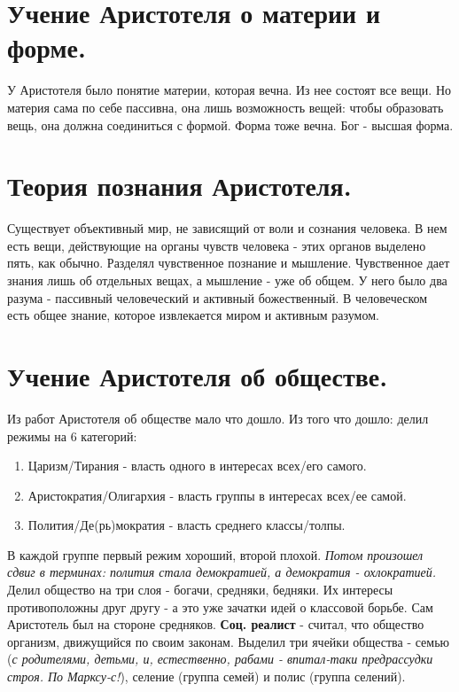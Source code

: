 \section{Учение Аристотеля о материи и форме.}
У Аристотеля было понятие материи, которая вечна. Из нее состоят все вещи. Но материя сама по себе пассивна, она лишь возможность вещей: чтобы образовать вещь, она должна соединиться с формой. Форма тоже вечна. Бог - высшая форма.

\section{Теория познания Аристотеля.}
Существует объективный мир, не зависящий от воли и сознания человека. В нем есть вещи, действующие на органы чувств человека - этих органов выделено пять, как обычно.
Разделял чувственное познание и мышление. Чувственное дает знания лишь об отдельных вещах, а мышление - уже об общем. У него было два разума - пассивный человеческий и активный божественный. 
В человеческом есть общее знание, которое извлекается миром и активным разумом. 

\section{Учение Аристотеля об обществе.}
Из работ Аристотеля об обществе мало что дошло. Из того что дошло: делил режимы на 6 категорий:
\begin{enumerate}
\item Царизм/Тирания - власть одного в интересах всех/его самого.
\item Аристократия/Олигархия - власть группы в интересах всех/ее самой.
\item Полития/Де(рь)мократия  - власть среднего классы/толпы.
\end{enumerate}
В каждой группе первый режим хороший, второй плохой. \textit{Потом произошел сдвиг в терминах: полития стала демократией, а демократия - охлократией.}
Делил общество на три слоя - богачи, средняки, бедняки. Их интересы противоположны друг другу - а это уже зачатки идей о классовой борьбе. Сам Аристотель был на стороне средняков. \textbf{Соц. реалист} - считал, что общество организм, движущийся по своим законам. Выделил три ячейки общества - семью (\textit{с родителями, детьми, и, естественно, рабами - впитал-таки предрассудки строя. По Марксу-с!}), селение (группа семей) и полис (группа селений).

